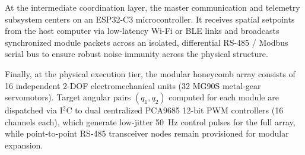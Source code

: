 \documentclass[lettersize,journal]{IEEEtran}
\begin{document}
	At the intermediate coordination layer, the master communication and telemetry subsystem centers on an ESP32-C3 microcontroller. It receives spatial setpoints from the host computer via low-latency Wi-Fi or BLE links and broadcasts synchronized module packets across an isolated, differential RS-485 / Modbus serial bus to ensure robust noise immunity across the physical structure.
	
	Finally, at the physical execution tier, the modular honeycomb array consists of 16 independent 2-DOF electromechanical units (32 MG90S metal-gear servomotors). Target angular pairs $(q_1, q_2)$ computed for each module are dispatched via I$^2$C to dual centralized PCA9685 12-bit PWM controllers (16 channels each), which generate low-jitter 50~Hz control pulses for the full array, while point-to-point RS-485 transceiver nodes remain provisioned for modular expansion.
	
\end{document}
